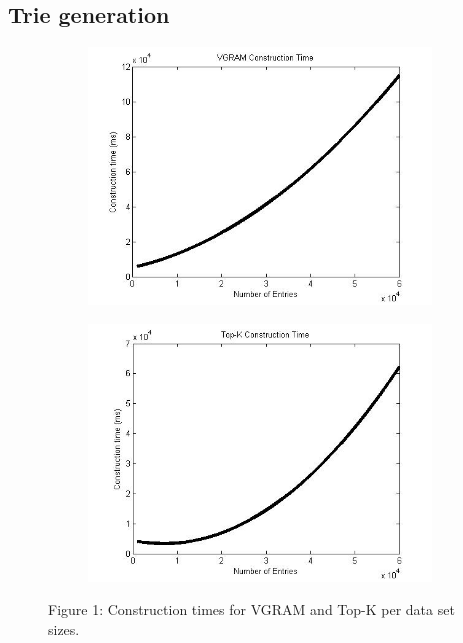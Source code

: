 \documentclass[pdftex,12pt,letter]{article}
\begin{document}
\subsection{Trie generation}
\begin{figure}[h!]
\centering
\begin{subfigure}[b]{0.45\textwidth}
\includegraphics[width=\textwidth]{VGRAMconstructionTime.jpg}
\label{fig:vgram}
\end{subfigure}
\begin{subfigure}[b]{0.45\textwidth}
\includegraphics[width=\textwidth]{TOPKconstructionTime.jpg}
\label{fig:topk}
\end{subfigure}
\begin{center}
Figure 1: Construction times for VGRAM and Top-K per data set sizes.
\end{center}
\end{figure}
\end{document}
